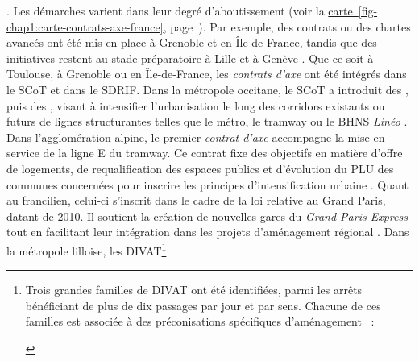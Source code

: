 \begin{refsegment}
{} \textcolor{blue}{\autocite[20]{afoun_mostaganem_2022}}. Les démarches varient dans leur degré d’aboutissement (voir la \hyperref[fig-chap1:carte-contrats-axe-france]{carte~\ref{fig-chap1:carte-contrats-axe-france}}, page~\pageref{fig-chap1:carte-contrats-axe-france}). Par exemple, des contrats ou des chartes avancés ont été mis en place à Grenoble et en Île-de-France, tandis que des initiatives restent au stade préparatoire à Lille et à Genève \textcolor{blue}{\autocites[2]{cerema_articuler_2010}[11]{cerema_articuler_2015}}. Que ce soit à Toulouse, à Grenoble ou en Île-de-France, les \textsl{contrats d'axe} ont été intégrés dans le \acrfull{SCoT} et dans le \acrfull{SDRIF}. Dans la métropole occitane, le \acrfull{SCoT} a introduit des , puis des , visant à intensifier l’urbanisation le long des corridors existants ou futurs de lignes structurantes telles que le métro, le tramway ou le \acrshort{BHNS} \textsl{Linéo} \textcolor{blue}{\autocites[49]{toulouse_metropole_plui-h_2019}[26]{meunier-chabert_contrats_2014}[3]{cerema_outils_2021}}. Dans l'agglomération alpine, le premier \textsl{contrat d’axe} accompagne la mise en service de la ligne E du tramway. Ce contrat fixe des objectifs en matière d’offre de logements, de requalification des espaces publics et d’évolution du \acrfull{PLU} des communes concernées pour inscrire les principes d’intensification urbaine \textcolor{blue}{\autocites[3]{aurg_contrat_2022}[2]{cerema_outils_2021}}. Quant au  francilien, celui-ci s’inscrit dans le cadre de la loi relative au Grand Paris, datant de 2010. Il soutient la création de nouvelles gares du \textsl{Grand Paris Express} tout en facilitant leur intégration dans les projets d’aménagement régional \textcolor{blue}{\autocite[19]{cerema_articuler_2015}}. Dans la métropole lilloise, les \acrshort{DIVAT}\footnote{
    Trois grandes familles de \acrfull{DIVAT} ont été identifiées, parmi les arrêts bénéficiant de plus de dix passages par jour et par sens. Chacune de ces familles est associée à des préconisations spécifiques d’aménagement \textcolor{blue}{\autocite[23]{cerema_articuler_2010}}~:
        \begin{customitemize}

\end{customitemize}}
\end{refsegment}
